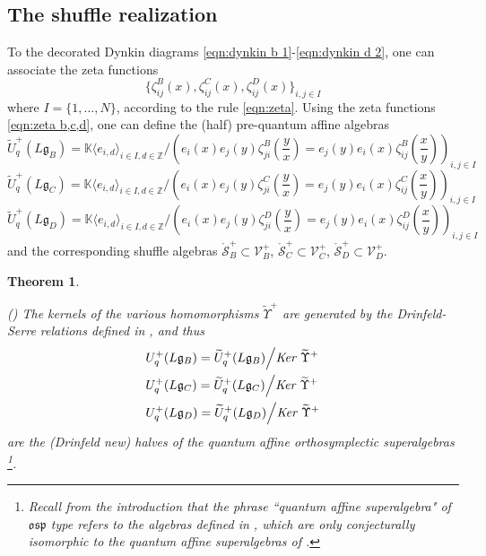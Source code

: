 \documentclass{amsart}
\newtheorem{theorem}[subsection]{Theorem}
\def\fg{{\mathfrak{g}}}
\def\BK{{\mathbb{K}}}
\def\BZ{{\mathbb{Z}}}
\def\CS{{\mathcal{S}}}
\def\CV{{\mathcal{V}}}
\def\tub{\widetilde{U}_q^+(L\fg_B)}
\def\tuc{\widetilde{U}_q^+(L\fg_C)}
\def\tud{\widetilde{U}_q^+(L\fg_D)}
\def\ub{U_q^+(L\fg_B)}
\def\uc{U_q^+(L\fg_C)}
\def\ud{U_q^+(L\fg_D)}
\def\oCS{\mathring{\CS}}
\def\fosp{\mathfrak{osp}}
\begin{document}
\medskip 

\subsection{The shuffle realization}
\label{sub:shuffle realization}

To the decorated Dynkin diagrams \eqref{eqn:dynkin b 1}-\eqref{eqn:dynkin d 2}, one can associate the zeta functions
\begin{equation} 
\label{eqn:zeta b,c,d}
\Big\{ \zeta^B_{ij}(x), \zeta^C_{ij}(x), \zeta^D_{ij}(x) \Big\}_{i,j \in I}
\end{equation} 
where $I = \{1,\dots,N\}$, according to the rule \eqref{eqn:zeta}. Using the zeta functions \eqref{eqn:zeta b,c,d}, one can define the (half) pre-quantum affine algebras
\begin{equation}
\label{eqn:quadratic b}
\tub = \BK \langle e_{i,d} \rangle_{i \in I, d\in \BZ} \Big/ \left(e_i(x)e_j(y) \zeta^{B}_{ji}\left(\frac yx\right) = e_j(y) e_i(x) \zeta^{B}_{ij}\left(\frac xy\right) \right)_{i,j \in I}
\end{equation}
\begin{equation}
\label{eqn:quadratic c}
\tuc = \BK \langle e_{i,d} \rangle_{i \in I, d\in \BZ} \Big/ \left(e_i(x)e_j(y) \zeta^{C}_{ji}\left(\frac yx\right) = e_j(y) e_i(x) \zeta^{C}_{ij}\left(\frac xy\right) \right)_{i,j \in I}
\end{equation}
\begin{equation}
\label{eqn:quadratic d}
\tud = \BK \langle e_{i,d} \rangle_{i \in I, d\in \BZ} \Big/ \left(e_i(x)e_j(y) \zeta^{D}_{ji}\left(\frac yx\right) = e_j(y) e_i(x) \zeta^{D}_{ij}\left(\frac xy\right) \right)_{i,j \in I}
\end{equation}
and the corresponding shuffle algebras $\oCS^+_B \subset \CV^+_B$, $\oCS^+_C \subset \CV^+_C$, $\oCS^+_D \subset \CV^+_D$. 

\medskip

\begin{theorem}
\label{thm:b,c,d 1}

(\cite[Theorems 1.1-1.3]{NT}) The kernels of the various homomorphisms $\widetilde{\Upsilon}^+$ are generated by the  Drinfeld-Serre relations defined in \cite{BFK,XZ}, and thus
\begin{align*}
&\ub = \tub \Big/ \emph{Ker }\widetilde{\Upsilon}^+ \\
&\uc = \tuc \Big/ \emph{Ker }\widetilde{\Upsilon}^+ \\ 
&\ud = \tud \Big/ \emph{Ker }\widetilde{\Upsilon}^+
\end{align*}
are the (Drinfeld new) halves of the quantum affine orthosymplectic superalgebras \footnote{Recall from the introduction that the phrase ``quantum affine superalgebra" of $\fosp$ type refers to the algebras defined in \cite{BFK, XZ}, which are only conjecturally isomorphic to the quantum affine superalgebras of \cite{Y2}.}.

\end{theorem}
\end{document}
